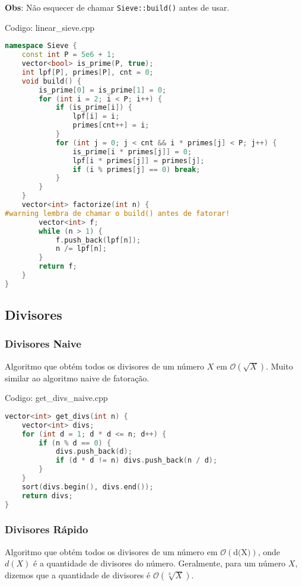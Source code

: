 \documentclass[10pt, a4paper, oneside]{book}
\begin{document}
\textbf{Obs}: Não esquecer de chamar \texttt{Sieve::build()} antes de usar.
\hfill

Codigo: linear\_sieve.cpp

\begin{lstlisting}[language=C++]
namespace Sieve {
    const int P = 5e6 + 1;
    vector<bool> is_prime(P, true);
    int lpf[P], primes[P], cnt = 0;
    void build() {
        is_prime[0] = is_prime[1] = 0;
        for (int i = 2; i < P; i++) {
            if (is_prime[i]) {
                lpf[i] = i;
                primes[cnt++] = i;
            }
            for (int j = 0; j < cnt && i * primes[j] < P; j++) {
                is_prime[i * primes[j]] = 0;
                lpf[i * primes[j]] = primes[j];
                if (i % primes[j] == 0) break;
            }
        }
    }
    vector<int> factorize(int n) {
#warning lembra de chamar o build() antes de fatorar!
        vector<int> f;
        while (n > 1) {
            f.push_back(lpf[n]);
            n /= lpf[n];
        }
        return f;
    }
}
\end{lstlisting}
\hfill

\subsection{Divisores}
\subsubsection{Divisores Naive}


Algoritmo que obtém todos os divisores de um número $X$ em $\mathcal{O}(\sqrt{X})$. Muito similar ao algoritmo naive de fatoração.
\hfill

Codigo: get\_divs\_naive.cpp

\begin{lstlisting}[language=C++]
vector<int> get_divs(int n) {
    vector<int> divs;
    for (int d = 1; d * d <= n; d++) {
        if (n % d == 0) {
            divs.push_back(d);
            if (d * d != n) divs.push_back(n / d);
        }
    }
    sort(divs.begin(), divs.end());
    return divs;
}
\end{lstlisting}
\hfill

\subsubsection{Divisores Rápido}


Algoritmo que obtém todos os divisores de um número em $\mathcal{O}(\text{d(X)})$, onde $d(X)$ é a quantidade de divisores do número. Geralmente, para um número $X$, dizemos que a quantidade de divisores é $\mathcal{O}(\sqrt[3]{X})$.
\end{document}
